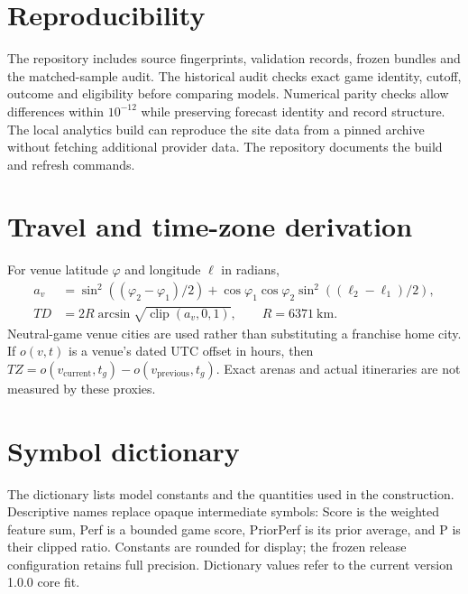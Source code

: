 \documentclass[11pt]{article}
\begin{document}
\section{Reproducibility}
The repository includes source fingerprints, validation records,
frozen bundles and the matched-sample audit. The historical audit
checks exact game identity, cutoff, outcome and eligibility before
comparing models. Numerical parity checks allow differences within
$10^{-12}$ while preserving forecast identity and record structure.
The local analytics build can reproduce the site data from a pinned
archive without fetching additional provider data. The repository
documents the build and refresh commands.

\appendix
\section{Travel and time-zone derivation}
For venue latitude $\varphi$ and longitude $\ell$ in radians,
\begin{align}
 a_v&=\sin^2((\varphi_2-\varphi_1)/2)
 +\cos\varphi_1\cos\varphi_2\sin^2((\ell_2-\ell_1)/2),\\
 TD&=2R\arcsin\sqrt{\operatorname{clip}(a_v,0,1)},\qquad R=6371\ \text{km}.
\end{align}
Neutral-game venue cities are used rather than substituting a franchise home
city. If $o(v,t)$ is a venue's dated UTC offset in hours, then
$TZ=o(v_{\mathrm{current}},t_g)-o(v_{\mathrm{previous}},t_g)$.
Exact arenas and actual itineraries are not measured by these proxies.

\clearpage
\section{Symbol dictionary}\label{app:symbols}
The dictionary lists model constants and the quantities used in the construction. Descriptive
names replace opaque intermediate symbols: Score is the weighted feature
sum, Perf is a bounded game score, PriorPerf is its prior average, and P is
their clipped ratio. Constants are rounded for display; the frozen release
configuration retains full precision. Dictionary values refer to the current
version 1.0.0 core fit.
\begingroup
\normalsize
\setlength{\tabcolsep}{4pt}
\renewcommand{\arraystretch}{1.14}
\end{document}
